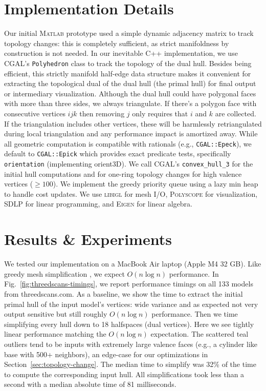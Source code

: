 \documentclass{egpubl}
\newcommand{\newhl}[1]{#1}
\begin{document}
\section{Implementation Details}
Our initial \textsc{Matlab} prototype used a simple dynamic adjacency matrix to track topology changes: this is completely sufficient, as strict manifoldness by construction is not needed.
In our inevitable C++ implementation, we use \textsc{CGAL}'s \texttt{Polyhedron} class to track the topology of the dual hull.
Besides being efficient, this strictly manifold half-edge data structure makes it convenient for extracting the topological dual of the dual hull (the primal hull) for final output or intermediary visualization.
Although the dual hull could have polygonal faces with more than three sides, we always triangulate. 
If there's a polygon face with consecutive vertices $ijk$ then removing $j$ only requires that $i$ and $k$ are collected. If the triangulation includes other vertices, these will be 
harmlessly retriangulated during local triangulation and any performance impact is amortized away.
While all geometric computation is compatible with rationals (e.g., \texttt{CGAL::Epeck}), we default to \texttt{CGAL::Epick} which provides exact predicate tests, specifically \texttt{orientation} (implementing \newhl{orient3D}).
We call \textsc{CGAL}'s \texttt{convex\_hull\_3} for the initial hull computations and for one-ring topology changes for high valence vertices ($\ge100$).
We implement the greedy priority queue using a lazy min heap to handle cost updates.
We use \textsc{libigl} \cite{libigl} for mesh I/O, \textsc{Polyscope} \cite{polyscope} for visualization, \textsc{SDLP} \cite{sdlp} for linear programming, and 
\textsc{Eigen} \cite{eigenweb} for linear algebra.


\section{Results \& Experiments}
We tested our implementation on a MacBook Air laptop (Apple M4 32 GB).
Like greedy mesh simplification \cite{GarlandH97}, we expect $O(n \log n)$ performance.
In Fig.~\ref{fig:threedscans-timings}, we report performance timings on all 133 models from threedscans.com.
As a baseline, we show the time to extract the initial primal hull of the input model's vertices: wide variance and as expected not very output sensitive but still roughly $O(n \log n)$ performance.
Then we time simplifying every hull down to 18 halfspaces (dual vertices). Here we see tightly linear performance matching the $O(n \log n)$ expectation.
\newhl{The scattered teal outliers tend to be inputs with extremely large valence faces (e.g., a cylinder like base with 500+ neighbors), an edge-case for our optimizations in Section~\ref{sec:topology-change}.}
The median time to simplify was 32\% of the time to compute the corresponding input hull.
All simplifications took less than a second with a  median absolute time of 81 milliseconds.
\end{document}
